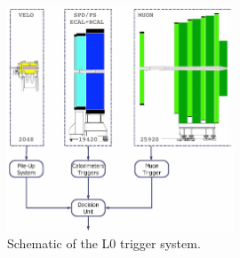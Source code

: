 \begin{figure}[!htb]
    \centering
    \includegraphics[width=0.6\textwidth]{./figs-detector/trigger/l0_system_schematic.pdf}
    \caption{
        Schematic of the L0 trigger system.
    }
    \label{fig:l0-schematic}
\end{figure}
